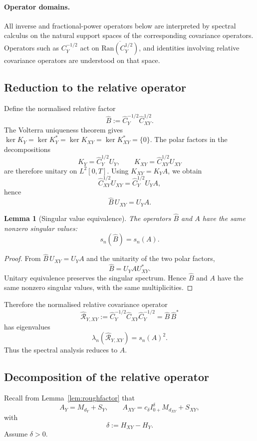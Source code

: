 \documentclass[11pt,a4paper]{amsart}
\theoremstyle{plain}
\newtheorem{lemma}[theorem]{Lemma}
\theoremstyle{definition}
\theoremstyle{remark}
\begin{document}
\paragraph{Operator domains.}
All inverse and fractional-power operators below are interpreted by spectral calculus on the natural
support spaces of the corresponding covariance operators.  Operators such as $C_Y^{-1/2}$ act on
$\overline{\mathrm{Ran}(C_Y^{1/2})}$, and identities involving relative covariance operators are
understood on that space.

\subsection{Reduction to the relative operator}

Define the normalised relative factor
\[
\widehat B:=\widehat C_Y^{-1/2}\widehat C_{XY}^{1/2}.
\]
The Volterra uniqueness theorem gives
\(\ker K_Y=\ker K_Y^*=\ker K_{XY}=\ker K_{XY}^*=\{0\}\). The polar factors in the decompositions
\[
K_Y=\widehat C_Y^{1/2}U_Y,
\qquad
K_{XY}=\widehat C_{XY}^{1/2}U_{XY}
\]
are therefore unitary on $L^2[0,T]$. Using $K_{XY}=K_YA$, we obtain
\[
\widehat C_{XY}^{1/2}U_{XY}
=
\widehat C_Y^{1/2}U_YA,
\]
hence
\[
\widehat B\,U_{XY}=U_YA.
\]

\begin{lemma}[Singular value equivalence]\label{lem:sv_equiv}
The operators $\widehat B$ and $A$ have the same nonzero singular values:
\[
s_n(\widehat B)=s_n(A).
\]
\end{lemma}

\begin{proof}
From $\widehat B\,U_{XY}=U_YA$ and the unitarity of the two polar factors,
\[
\widehat B=U_YA U_{XY}^*.
\]
Unitary equivalence preserves the singular spectrum. Hence $\widehat B$ and $A$ have the same
nonzero singular values, with the same multiplicities.
\end{proof}

Therefore the normalised relative covariance operator
\[
\widehat{\mathcal R}_{Y,XY}:=\widehat C_Y^{-1/2}\widehat C_{XY}\widehat C_Y^{-1/2}
=\widehat B\,\widehat B^*
\]
has eigenvalues
\[
\lambda_n(\widehat{\mathcal R}_{Y,XY})=s_n(A)^2.
\]
Thus the spectral analysis reduces to $A$.

\subsection{Decomposition of the relative operator}

Recall from Lemma~\ref{lem:roughfactor} that
\[
A_Y = M_{d_Y} + S_Y,
\qquad
A_{XY} = c_\delta I_{0+}^{\delta} M_{d_{XY}} + S_{XY},
\]
with
\[
\delta := H_{XY} - H_Y.
\]
Assume $\delta > 0$.
\end{document}
